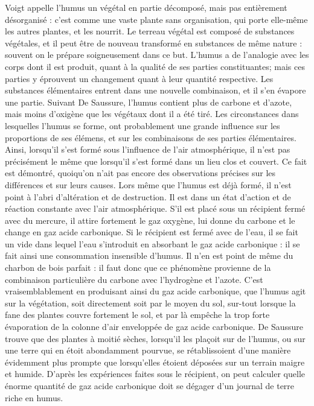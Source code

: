 Voigt appelle l’humus un végétal en partie décomposé, mais pas entièrement désorganisé : c’est comme une vaste plante sans organisation, qui porte elle-même les autres plantes, et les nourrit. Le terreau végétal est composé de substances végétales, et il peut être de nouveau transformé en substances de même nature : souvent on le prépare soigneusement dans ce but.
L’humus a de l’analogie avec les corps dont il est produit, quant à la qualité de ses parties constituantes; mais ces parties y éprouvent un changement quant à leur quantité respective. Les substances élémentaires entrent dans une nouvelle combinaison, et il s’en évapore une partie. Suivant De Saussure, l’humus contient plus de carbone et d’azote, mais moins d’oxigène\setcounter{page}{59} que les végétaux dont il a été tiré. Les circonstances dans lesquelles l'humus se forme, ont probablement une grande influence sur les proportions de ses élémens, et sur les combinaisons de ses parties élémentaires. Ainsi, lorsqu'il s'est formé sous l'influence de l'air atmosphérique, il n'est pas précisément le même que lorsqu'il s'est formé dans un lieu clos et couvert. Ce fait est démontré, quoiqu'on n'ait pas encore des observations précises sur les différences et sur leurs causes.
Lors même que l'humus est déjà formé, il n'est point à l'abri d'altération et de destruction. Il est dans un état d'action et de réaction constante avec l'air atmosphérique. S'il est placé sous un récipient fermé avec du mercure, il attire fortement le gaz oxygène, lui donne du carbone et le change en gaz acide carbonique. Si le récipient est fermé avec de l'eau, il se fait un vide dans lequel l'eau s'introduit en absorbant le gaz acide carbonique : il se fait ainsi une consommation insensible d'humus. Il n'en est point de même du charbon de bois parfait : il faut donc que ce phénomène provienne de la combinaison particulière du carbone avec l'hydrogène et l'azote. C'est\setcounter{page}{60} vraisemblablement en produisant ainsi du gaz acide carbonique, que l'humus agit sur la végétation, soit directement soit par le moyen du sol, sur-tout lorsque la fane des plantes couvre fortement le sol, et par là empêche la trop forte évaporation de la colonne d'air enveloppée de gaz acide carbonique. De Saussure trouve que des plantes à moitié sèches, lorsqu'il les plaçoit sur de l'humus, ou sur une terre qui en étoit abondamment pourvue, se rétablissoient d'une manière évidemment plus prompte que lorsqu'elles étoient déposées sur un terrain maigre et humide. D'après les expériences faites sous le récipient, on peut calculer quelle énorme quantité de gaz acide carbonique doit se dégager d'un journal de terre riche en humus.
